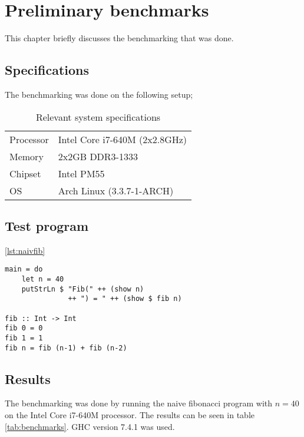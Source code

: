 
\chapter{Preliminary benchmarks}

This chapter briefly discusses the benchmarking that was done.

\section{Specifications}

The benchmarking was done on the following setup;

\begin{table}[H]

\centering
\begin{tabular}{l|l}

\hline
\hline
Processor & Intel Core i7-640M (2x2.8GHz) \\
Memory    & 2x2GB DDR3-1333 \\
Chipset   & Intel PM55 \\
OS        & Arch Linux (3.3.7-1-ARCH) \\
\hline
\end{tabular}

\caption{Relevant system specifications}

\end{table}

\section{Test program}

\ref{lst:naivfib}

\lstset{ %
language=Python,
caption=Naive fibonacci implementation in Haskell,
label=lst:naivfib
}
\begin{lstlisting}
main = do 
    let n = 40
    putStrLn $ "Fib(" ++ (show n) 
               ++ ") = " ++ (show $ fib n)

fib :: Int -> Int
fib 0 = 0
fib 1 = 1
fib n = fib (n-1) + fib (n-2)
\end{lstlisting}

\section{Results}

The benchmarking was done by running the naive fibonacci program with $n=40$ 
on the Intel Core i7-640M processor. The results can be seen in table 
\ref{tab:benchmarks}. GHC version 7.4.1 was used. 

